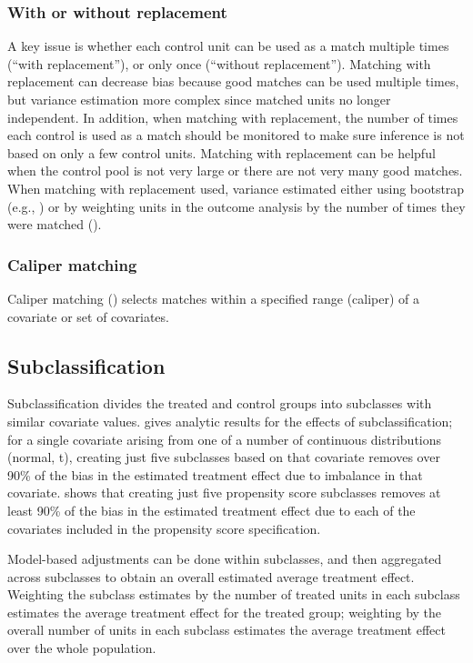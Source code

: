 \documentclass[11pt,titlepage]{article}
\begin{document}
\subsubsection{With or without replacement}
A key issue is whether each control unit can be used as a match multiple times (``with replacement''), or only once (``without replacement'').  Matching with replacement
can decrease bias because good matches can be used multiple times, but variance estimation more complex since matched units no longer independent.  In addition, when
matching with replacement, the number of times each control is used as a match should be monitored to make sure inference is not based on only a few control units.
Matching with replacement can be helpful when the control pool is not very large or there are not very many good matches.  When matching with replacement used,
variance estimated either using bootstrap (e.g., \cite{AgoDyn04}) or by weighting units in the outcome analysis by the number of times they were matched (\cite{DehWah02,
HilReiZan04}).

\subsubsection{Caliper matching}
Caliper matching (\cite{AltRub70}) selects matches within a specified range (caliper) of a covariate or set of covariates.  

\subsection{Subclassification}
Subclassification divides the treated and control groups into subclasses with similar covariate values.  \cite{Cochran68} gives analytic
results for the effects of subclassification; for a single covariate arising from one of a number of continuous distributions (normal, t), creating just five subclasses
based on that covariate removes over 90\% of the bias in the estimated treatment effect due to imbalance in that covariate. \cite{RosRub84}
shows that creating just five propensity score subclasses removes at least 90\% of the bias in the estimated treatment effect due to each of the covariates
included in the propensity score specification.  

Model-based adjustments can be done within subclasses, and then aggregated across subclasses to obtain an overall
estimated average treatment effect.  Weighting the subclass estimates by the number of treated units in each subclass estimates the average treatment effect
for the treated group; weighting by the overall number of units in each subclass estimates the average treatment effect over the whole population.  
\end{document}
